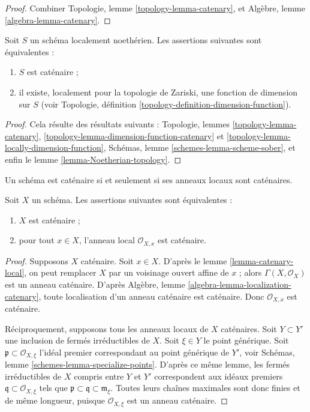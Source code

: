 \begin{proof}
Combiner Topologie, lemme \ref{topology-lemma-catenary}, et
Algèbre, lemme \ref{algebra-lemma-catenary}.
\end{proof}

\begin{lemma}
\label{lemma-catenary-dimension-function}
Soit $S$ un schéma localement noethérien.
Les assertions suivantes sont équivalentes :
\begin{enumerate}
\item $S$ est caténaire ;
\item il existe, localement pour la topologie de Zariski, une fonction de dimension
sur $S$ (voir Topologie, définition \ref{topology-definition-dimension-function}).
\end{enumerate}
\end{lemma}

\begin{proof}
Cela résulte des résultats suivants :
Topologie, lemmes
\ref{topology-lemma-catenary},
\ref{topology-lemma-dimension-function-catenary} et
\ref{topology-lemma-locally-dimension-function},
Schémas, lemme \ref{schemes-lemma-scheme-sober},
et enfin le lemme \ref{lemma-Noetherian-topology}.
\end{proof}

\noindent
Un schéma est caténaire si et seulement si ses anneaux
locaux sont caténaires.

\begin{lemma}
\label{lemma-catenary-local-rings-catenary}
Soit $X$ un schéma. Les assertions suivantes sont équivalentes :
\begin{enumerate}
\item $X$ est caténaire ;
\item pour tout $x \in X$, l'anneau local $\mathcal{O}_{X, x}$ est
caténaire.
\end{enumerate}
\end{lemma}

\begin{proof}
Supposons $X$ caténaire. Soit $x \in X$. D'après le lemme \ref{lemma-catenary-local},
on peut remplacer $X$ par un voisinage ouvert affine de $x$ ; alors
$\Gamma(X, \mathcal{O}_X)$ est un anneau caténaire. D'après
Algèbre, lemme \ref{algebra-lemma-localization-catenary}, toute
localisation d'un anneau caténaire est
caténaire. Donc $\mathcal{O}_{X, x}$ est caténaire.

\medskip\noindent
Réciproquement, supposons tous les anneaux locaux de $X$ caténaires.
Soit $Y \subset Y'$ une inclusion de fermés
irréductibles de $X$. Soit $\xi \in Y$ le point générique.
Soit $\mathfrak p \subset \mathcal{O}_{X, \xi}$ l'idéal premier
correspondant au point générique de $Y'$, voir
Schémas, lemme \ref{schemes-lemma-specialize-points}. D'après ce même
lemme, les fermés irréductibles de $X$ compris entre $Y$ et $Y'$
correspondent aux idéaux premiers $\mathfrak q \subset \mathcal{O}_{X, \xi}$
tels que $\mathfrak p \subset \mathfrak q \subset \mathfrak m_{\xi}$.
Toutes leurs chaînes maximales sont donc finies et de même
longueur, puisque $\mathcal{O}_{X, \xi}$ est un anneau caténaire.
\end{proof}

